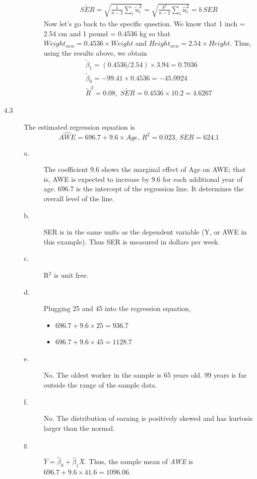 \documentclass[a4paper,11pt]{article}
\begin{document}
\begin{description}
\begin{description}
\begin{gather*}
\widetilde{SER} = \sqrt{\frac{1}{n-2} \sum_i \tilde{u}_i^2} = \sqrt{\frac{b^2}{n-2} \sum_i \hat{u}^2_i} = b\,SER
\end{gather*}
Now let's go back to the specific question. We know that 1
inch = 2.54 cm and 1 pound = 0.4536 kg so that \(Weight_{new}
          = 0.4536 \times Weight\) and \(Height_{new} = 2.54 \times Height\). Thus,
using the results above, we obtain
\begin{gather*}
\tilde{\beta}_1 = (0.4536/2.54) \times 3.94 = 0.7036 \\
\tilde{\beta}_0 = -99.41 \times 0.4536 = -45.0924 \\
\tilde{R}^2 = 0.08,\; \widetilde{SER} = 0.4536 \times 10.2 = 4.6267
\end{gather*}
\end{description}

\item[{4.3}] The estimated regression equation is
\[ \widehat{AWE} = 696.7 + 9.6 \times Age,\, R^2 = 0.023,\,
         SER = 624.1 \]
\begin{description}
\item[{a.}] The coefficient 9.6 shows the marginal effect of Age on AWE;
that is, AWE is expected to increase by 9.6 for each
additional year of age. 696.7 is the intercept of the
regression line. It determines the overall level of the
line.
\item[{b.}] SER is in the same units as the dependent variable (Y, or
AWE in this example). Thus SER is measured in dollars per
week.
\item[{c.}] R\(^{\text{2}}\) is unit free.
\item[{d.}] Plugging 25 and 45 into the regression equation,
\begin{itemize}
\item \(696.7 + 9.6 \times 25 = 936.7\)
\item \(696.7 + 9.6 \times 45 = 1128.7\)
\end{itemize}
\item[{e.}] No. The oldest worker in the sample is 65 years old. 99
years is far outside the range of the sample data.
\item[{f.}] No. The distribution of earning is positively skewed and has
kurtosis larger than the normal.
\item[{g}] \(\bar{Y} = \hat{\beta}_0 + \hat{\beta}_1 \bar{X}\). Thus, the
sample mean of \emph{AWE} is \(696.7 + 9.6 \times 41.6 = 1096.06\).
\end{description}


\end{description}
\end{document}
